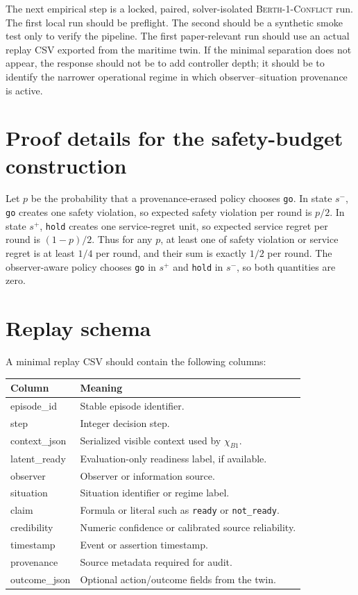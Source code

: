 \documentclass[11pt]{article}
\newcommand{\1}{\mathbf{1}}
\theoremstyle{definition}
\theoremstyle{plain}
\theoremstyle{remark}
\begin{document}
The next empirical step is a locked, paired, solver-isolated \textsc{Berth-1-Conflict} run. The first local run should be preflight. The second should be a synthetic smoke test only to verify the pipeline. The first paper-relevant run should use an actual replay CSV exported from the maritime twin. If the minimal separation does not appear, the response should not be to add controller depth; it should be to identify the narrower operational regime in which observer--situation provenance is active.



\appendix

\section{Proof details for the safety-budget construction}
\label{app:safety-proof}

Let $p$ be the probability that a provenance-erased policy chooses \texttt{go}. In state $s^-$, \texttt{go} creates one safety violation, so expected safety violation per round is $p/2$. In state $s^+$, \texttt{hold} creates one service-regret unit, so expected service regret per round is $(1-p)/2$. Thus for any $p$, at least one of safety violation or service regret is at least $1/4$ per round, and their sum is exactly $1/2$ per round. The observer-aware policy chooses \texttt{go} in $s^+$ and \texttt{hold} in $s^-$, so both quantities are zero.

\section{Replay schema}
\label{app:schema}

A minimal replay CSV should contain the following columns:
\begin{center}
\begin{tabularx}{\textwidth}{@{}p{}X@{}}
\toprule
Column & Meaning \\
\midrule
episode\_id & Stable episode identifier. \\
step & Integer decision step. \\
context\_json & Serialized visible context used by $\chi_{B1}$. \\
latent\_ready & Evaluation-only readiness label, if available. \\
observer & Observer or information source. \\
situation & Situation identifier or regime label. \\
claim & Formula or literal such as \texttt{ready} or \texttt{not\_ready}. \\
credibility & Numeric confidence or calibrated source reliability. \\
timestamp & Event or assertion timestamp. \\
provenance & Source metadata required for audit. \\
outcome\_json & Optional action/outcome fields from the twin. \\
\bottomrule
\end{tabularx}
\end{center}
\end{document}
